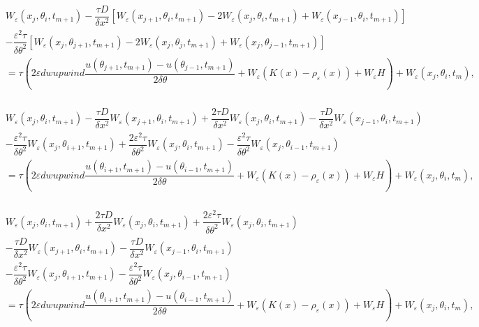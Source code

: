 \documentclass{article}
\begin{document}
 \begin{equation}
\begin{aligned}
& W_\varepsilon(x_j, \theta_i, t_{m+1}) -\dfrac{\tau D}{\delta x^2}[W_\varepsilon(x_{j+1},\theta_i, t_{m+1}) - 2W_\varepsilon(x_j,\theta_i,t_{m+1}) + W_\varepsilon(x_{j-1}, \theta_i, t_{m+1})] \\
&-\dfrac{\varepsilon^2\tau}{\delta\theta^2}[W_\varepsilon(x_j,\theta_{j+1},t_{m+1})-2W_\varepsilon(x_j,\theta_{j}, t_{m+1})+W_\varepsilon(x_j,\theta_{j-1}, t_{m+1})] \\
&= \tau(2\varepsilon dwupwind\dfrac{u(\theta_{j+1},t_{m+1}) -u(\theta_{j-1},t_{m+1})}{2\delta\theta}
+ W_\varepsilon (K(x)-\rho_\varepsilon(x)) + W_\varepsilon H) + W_\varepsilon(x_j, \theta_i, t_m),\\
\end{aligned}
\end{equation}

 \begin{equation}
\begin{aligned}
& W_\varepsilon(x_j, \theta_i, t_{m+1}) -\dfrac{\tau D}{\delta x^2}W_\varepsilon(x_{j+1},\theta_i, t_{m+1}) + \dfrac{2\tau D}{\delta x^2} W_\varepsilon(x_j,\theta_i,t_{m+1}) -\dfrac{\tau D}{\delta x^2} W_\varepsilon(x_{j-1}, \theta_i, t_{m+1}) \\
&-\dfrac{\varepsilon^2\tau}{\delta\theta^2}W_\varepsilon(x_j,\theta_{i+1},t_{m+1})+\dfrac{2\varepsilon^2\tau}{\delta\theta^2}W_\varepsilon(x_j,\theta_{i}, t_{m+1})-\dfrac{\varepsilon^2\tau}{\delta\theta^2}W_\varepsilon(x_j,\theta_{i-1}, t_{m+1}) \\
&= \tau(2\varepsilon dwupwind\dfrac{u(\theta_{i+1},t_{m+1}) -u(\theta_{i-1},t_{m+1})}{2\delta\theta}
+ W_\varepsilon (K(x)-\rho_\varepsilon(x)) + W_\varepsilon H) + W_\varepsilon(x_j, \theta_i, t_m),\\
\end{aligned}
\end{equation}

 \begin{equation}
\begin{aligned}
& W_\varepsilon(x_j, \theta_i, t_{m+1}) + \dfrac{2\tau D}{\delta x^2} W_\varepsilon(x_j,\theta_i,t_{m+1}) +\dfrac{2\varepsilon^2\tau}{\delta\theta^2}W_\varepsilon(x_j,\theta_{i}, t_{m+1})\\
 & -\dfrac{\tau D}{\delta x^2}W_\varepsilon(x_{j+1},\theta_i, t_{m+1}) -\dfrac{\tau D}{\delta x^2} W_\varepsilon(x_{j-1}, \theta_i, t_{m+1}) \\
&-\dfrac{\varepsilon^2\tau}{\delta\theta^2}W_\varepsilon(x_j,\theta_{i+1},t_{m+1})-\dfrac{\varepsilon^2\tau}{\delta\theta^2}W_\varepsilon(x_j,\theta_{i-1}, t_{m+1}) \\
&= \tau(2\varepsilon dwupwind\dfrac{u(\theta_{i+1},t_{m+1}) -u(\theta_{i-1},t_{m+1})}{2\delta\theta}
+ W_\varepsilon (K(x)-\rho_\varepsilon(x)) + W_\varepsilon H) + W_\varepsilon(x_j, \theta_i, t_m),\\
\end{aligned}
\end{equation}
\end{document}
